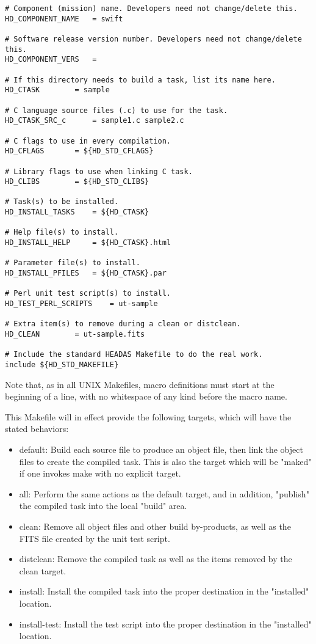 \documentclass[11pt]{book}
\begin{document}
\begin{verbatim}
# Component (mission) name. Developers need not change/delete this.
HD_COMPONENT_NAME	= swift

# Software release version number. Developers need not change/delete this.
HD_COMPONENT_VERS	=

# If this directory needs to build a task, list its name here.
HD_CTASK		= sample

# C language source files (.c) to use for the task.
HD_CTASK_SRC_c		= sample1.c sample2.c

# C flags to use in every compilation.
HD_CFLAGS		= ${HD_STD_CFLAGS}

# Library flags to use when linking C task.
HD_CLIBS		= ${HD_STD_CLIBS}

# Task(s) to be installed.
HD_INSTALL_TASKS	= ${HD_CTASK}

# Help file(s) to install.
HD_INSTALL_HELP		= ${HD_CTASK}.html

# Parameter file(s) to install.
HD_INSTALL_PFILES	= ${HD_CTASK}.par

# Perl unit test script(s) to install.
HD_TEST_PERL_SCRIPTS	= ut-sample

# Extra item(s) to remove during a clean or distclean.
HD_CLEAN		= ut-sample.fits

# Include the standard HEADAS Makefile to do the real work.
include ${HD_STD_MAKEFILE}
\end{verbatim}

Note that, as in all UNIX Makefiles, macro definitions
must start at the beginning of a line, with no whitespace
of any kind before the macro name.

This Makefile will in effect provide the following targets,
which will have the stated behaviors:

\begin{itemize}
\item default: Build each source file to produce an object file,
then link the object files to create the compiled task. This
is also the target which will be "maked" if one invokes make
with no explicit target.

\item all: Perform the same actions as the default target, and in
addition, "publish" the compiled task into the local "build" area.

\item clean: Remove all object files and other build by-products,
as well as the FITS file created by the unit test script.

\item distclean: Remove the compiled task as well as the items
removed by the clean target.

\item install: Install the compiled task into the proper destination
in the "installed" location.

\item install-test: Install the test script into the proper destination
in the "installed" location.
\end{itemize}
\end{document}
